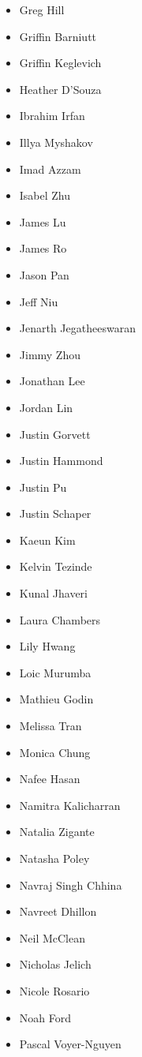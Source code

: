 \documentclass[main.tex]{subfiles}
\begin{document}
\begin{multicols}{3}
\begin{itemize}[label={},noitemsep]
     \item {Greg Hill}
	 \item {Griffin Barniutt}
     \item {Griffin Keglevich}
	 \item {Heather D'Souza}
     \item {Ibrahim Irfan}
     \item {Illya Myshakov}
	 \item {Imad Azzam}
     \item {Isabel Zhu}
	 \item {James Lu}
     \item {James Ro}
	 \item {Jason Pan}
     \item {Jeff Niu}
	 \item {Jenarth Jegatheeswaran}
     \item {Jimmy Zhou}
	 \item {Jonathan Lee}
     \item {Jordan Lin}
	 \item {Justin Gorvett}
     \item {Justin Hammond}
	 \item {Justin Pu}
     \item {Justin Schaper}
	 \item {Kaeun Kim}
     \item {Kelvin Tezinde}
	 \item {Kunal Jhaveri} 
	 \item {Laura Chambers}
     \item {Lily Hwang}
	 \item {Loic Murumba}
     \item {Mathieu Godin}
	 \item {Melissa Tran}
     \item {Monica Chung}
	 \item {Nafee Hasan}
     \item {Namitra Kalicharran}
	 \item {Natalia Zigante}
     \item {Natasha Poley}
	 \item {Navraj Singh Chhina}
     \item {Navreet Dhillon}
	 \item {Neil McClean}
     \item {Nicholas Jelich}
	 \item {Nicole Rosario}
     \item {Noah Ford}
	 \item {Pascal Voyer-Nguyen}

\end{itemize}
\end{multicols}
\end{document}
